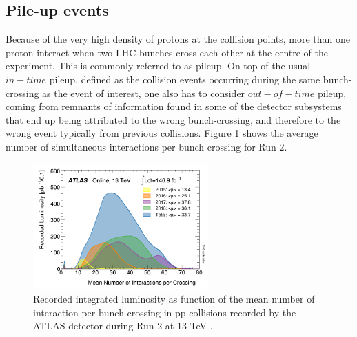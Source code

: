 \subsection{Pile-up events}
\label{chap2:LHC:PU}
Because of the very high density of protons at the collision points, more than one proton interact when two LHC bunches cross each other at the centre of the experiment. This is commonly referred to as pileup. On top of the usual $in-time$ pileup, defined as the collision events occurring during the same bunch-crossing as the event of interest, one also has to consider $out-of-time$ pileup, coming from remnants of information found in some of the detector subsystems that end up being attributed to the wrong bunch-crossing, and therefore to the wrong event typically from previous collisions. Figure \ref{fig:chap2:LHC:PU} shows the average number of simultaneous interactions per bunch crossing for Run 2. \\
\begin{figure}[htbp]
    \centering
    \includegraphics[width=0.6\textwidth]{Ch2/Img/PU.png}
    \caption{Recorded integrated luminosity as function of the mean number of interaction per bunch crossing in pp collisions recorded by the ATLAS detector during Run 2 at 13 TeV \cite{Lumi2018}.}
    \label{fig:chap2:LHC:PU}
\end{figure}

